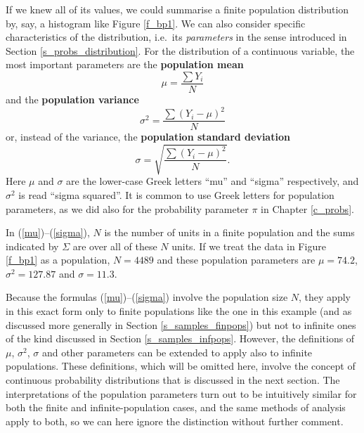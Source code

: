If we knew all of its values, we could summarise a finite population
distribution by, say, a histogram like Figure \ref{f_bp1}. We
can also consider specific characteristics of the distribution, i.e.\
its \emph{parameters} in the sense introduced in Section
\ref{s_probs_distribution}. For the distribution of a  continuous variable, the most
important parameters are the \textbf{population mean}
\begin{equation}
\mu=\frac{\sum Y_{i}}{N}
\label{mu}
\end{equation}
and the \textbf{population variance}
\begin{equation}
\sigma^{2} = \frac{\sum (Y_{i}-\mu)^{2}}{N}
\label{sigma2}
\end{equation}
or, instead of the variance, the \textbf{population standard deviation}
\begin{equation}
\sigma = \sqrt{\frac{\sum (Y_{i}-\mu)^{2}}{N}}.
\label{sigma}
\end{equation}
Here $\mu$ and $\sigma$ are the lower-case Greek letters ``mu'' and
``sigma'' respectively, and $\sigma^{2}$ is read ``sigma squared''. It
is common to use Greek letters for population parameters, as we did also
for the probability parameter $\pi$ in Chapter \ref{c_probs}.

In (\ref{mu})--(\ref{sigma}), $N$ is the number of units in a finite
population and the sums indicated by $\Sigma$ are over all of
these $N$ units. If we treat the data in Figure \ref{f_bp1} as a
population, $N=4489$ and these population parameters are $\mu=74.2$,
$\sigma^{2}=127.87$ and $\sigma=11.3$.

Because the formulas (\ref{mu})--(\ref{sigma}) involve the population
size $N$, they apply in this exact form only to finite populations like
the one in this example (and as discussed more generally in Section
\ref{s_samples_finpops}) but not to infinite ones of the kind discussed
in Section \ref{s_samples_infpops}. However, the definitions of $\mu$,
$\sigma^{2}$, $\sigma$ and other parameters can be extended to apply
also to infinite populations. These definitions, which will be omitted
here, involve the concept of continuous probability distributions that
is discussed in the next section. The interpretations of the population
parameters turn out to be intuitively similar for both the finite and
infinite-population cases, and the same methods of analysis apply to
both, so we can here ignore the distinction without further comment.

